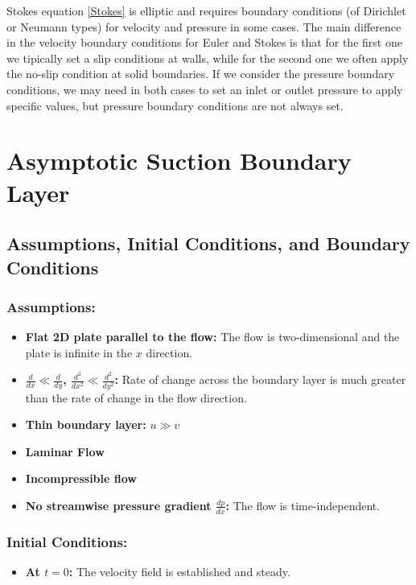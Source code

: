\documentclass{article}
\begin{document}
Stokes equation \eqref{Stokes} is elliptic and requires boundary conditions (of Dirichlet or Neumann types) for velocity and pressure in some cases.
The main difference in the velocity boundary conditions for Euler and Stokes is that for the first one we tipically set a slip conditions at walls, while for the second one we often apply the no-slip condition at solid boundaries.
If we consider the pressure boundary conditions, we may need in both cases to set an inlet or outlet pressure to apply specific values, but pressure boundary conditions are not always set.

\section{Asymptotic Suction Boundary Layer}

\subsection{Assumptions, Initial Conditions, and Boundary Conditions}

\subsubsection{Assumptions:}
\begin{itemize}
    \item \textbf{Flat 2D plate parallel to the flow:} The flow is two-dimensional and the plate is infinite in the \(x\) direction.
    \item \textbf{\(\frac{d}{dx} \ll \frac{d}{dy}\), \(\frac{d^2}{dx^2} \ll \frac{d^2}{dy^2}\):} Rate of change across the boundary layer is much greater than the rate of change in the flow direction.
    \item \textbf{Thin boundary layer:} \(u \gg v\)
    \item \textbf{Laminar Flow}
    \item \textbf{Incompressible flow}
    \item \textbf{No streamwise pressure gradient \(\frac{dp}{dx}\):} The flow is time-independent.
\end{itemize}

\subsubsection{Initial Conditions:}
\begin{itemize}
    \item \textbf{At \(t = 0\):} The velocity field is established and steady.
\end{itemize}
\end{document}
